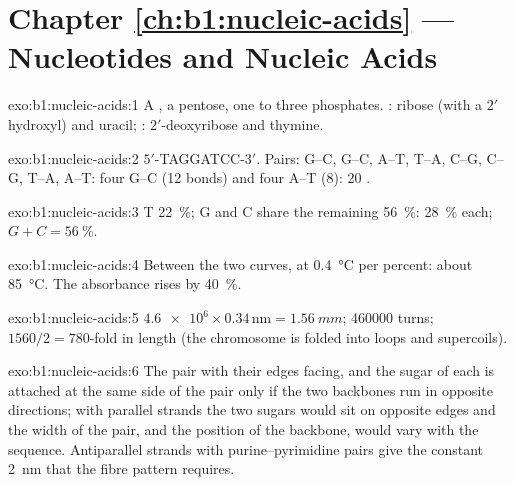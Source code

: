\section*{Chapter \ref{ch:b1:nucleic-acids} --- Nucleotides and Nucleic Acids}

\begin{solution}{exo:b1:nucleic-acids:1}
A , a pentose, one to three phosphates. : ribose
(with a $2'$ hydroxyl) and uracil; : $2'$-deoxyribose and thymine.
\end{solution}

\begin{solution}{exo:b1:nucleic-acids:2}
$5'$-TAGGATCC-$3'$. Pairs: G--C, G--C, A--T, T--A, C--G, C--G, T--A,
A--T: four G--C (12 bonds) and four A--T (8): 20 .
\end{solution}

\begin{solution}{exo:b1:nucleic-acids:3}
T \qty{22}{\%}; G and C share the remaining \qty{56}{\%}: \qty{28}{\%}
each; $G + C = \qty{56}{\%}$.
\end{solution}

\begin{solution}{exo:b1:nucleic-acids:4}
Between the two curves, at \qty{0.4}{\celsius} per percent: about
\qty{85}{\celsius}. The absorbance rises by \qty{40}{\%}.
\end{solution}

\begin{solution}{exo:b1:nucleic-acids:5}
$\num{4.6e6}\times 0.34\,\mathrm{nm} = \qty{1.56}{mm}$; \num{460000}
turns; $1560/2 = 780$-fold in length (the chromosome is folded into
loops and supercoils).
\end{solution}

\begin{solution}{exo:b1:nucleic-acids:6}
The  pair with their edges facing, and the sugar of each is
attached at the same side of the pair only if the two backbones run in
opposite directions; with parallel strands the two sugars would sit on
opposite edges and the width of the pair, and the position of the
backbone, would vary with the sequence. Antiparallel strands with
purine--pyrimidine pairs give the constant \qty{2}{nm} that the fibre
pattern requires.
\end{solution}

